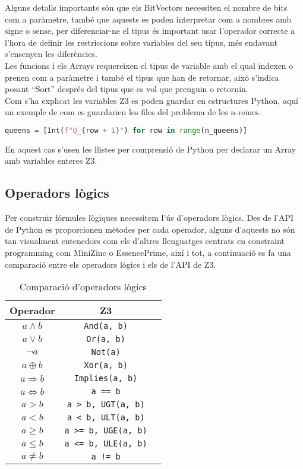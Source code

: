 Alguns detalls importants són que els BitVectors necessiten el nombre de bits com a paràmetre, també que aquests es poden interpretar com a nombres amb signe o sense, per diferenciar-ne el tipus és important usar l'operador correcte a l'hora de definir les restriccions sobre variables del seu tipus, més endavant s'ensenyen les diferències.\\
Les funcions i els Arrays requereixen el tipus de variable amb el qual indexen o prenen com a paràmetre i també el tipus que han de retornar, això s'indica posant ``Sort'' després del tipus que es vol que prenguin o retornin.\\

Com s'ha explicat les variables Z3 es poden guardar en estructures Python, aquí un exemple de com es guardarien les files del problema de les n-reines.
\begin{lstlisting}[language=Python, caption=Variables Z3 en arrays de Python]
queens = [Int(f"Q_{row + 1}") for row in range(n_queens)]
\end{lstlisting}
En aquest cas s'usen les llistes per comprensió de Python per declarar un Array amb variables enteres Z3.

\subsection{Operadors lògics}
Per construir fórmules lògiques necessitem l'ús d'operadors lògics. Des de l'API de Python es proporcionen mètodes per cada operador, alguns d'aquests no són tan visualment entenedors com els d'altres llenguatges centrats en constraint programming com MiniZinc o EssencePrime, així i tot, a continuació es fa una comparació entre els operadors lògics i els de l'API de Z3.

\begin{table}[h]
\centering
\begin{tabular}{|c|c|c|}
\hline
\textbf{Operador} & \textbf{Z3} \\
\hline
$a \land b$ & \verb|And(a, b)|  \\
\hline
$a \lor b$ & \verb|Or(a, b)|  \\
\hline
$\lnot a$ & \verb|Not(a)|  \\
\hline
$a \oplus b$ & \verb|Xor(a, b)|  \\
\hline
$a \Rightarrow b$ & \verb|Implies(a, b)|  \\
\hline
$a \Leftrightarrow b$ & \verb|a == b|  \\
\hline
$a > b$ & \verb|a > b, UGT(a, b)|  \\
\hline
$a < b$ & \verb|a < b, ULT(a, b)|  \\
\hline
$a \geq b$ & \verb|a >= b, UGE(a, b)|  \\
\hline
$a \leq b$ & \verb|a <= b, ULE(a, b)|  \\
\hline
$a \neq b$ & \verb|a != b|  \\
\hline
\end{tabular}
\caption{Comparació d'operadors lògics}
\label{tab:logic_oprator_comparison}
\end{table}

